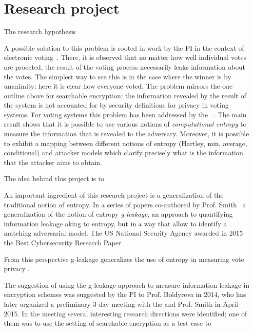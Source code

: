 
\section{Research project}
\label{sec:prop_hyp}

The research hypothesis 


A possible solution to this problem is rooted in work by the PI in the context of electronic voting~\cite{bernhard2012measuring}. 
There, it is observed that no matter how well individual votes are proected, the result of the voting process necessarily leaks information about the votes.
The simplest way to see this is in the case where the winner is by unanimity: here it is clear how everyone voted.  The problem mirrors the one outline above for searchable encryption:  the information revealed by the result of the system is not accounted for by security definitions for privacy in voting systems. 
For voting systems this problem has been addressed by the \PI~\cite{bernhard2012measuring}. 
The main result shows that it is possible to use various notions of \emph{computational entropy} to measure the information that is revealed to the adversary.  
Moreover, it is possible to exhibit a mapping between different notions of entropy (Hartley, min, average, conditional) and attacker models which clarify precisely what is the information that the attacker aims to obtain. 

The idea behind this project is to 


An important ingredient of this research project is a generalization of the traditional notion of entropy. 
In a series of papers co-authored by Prof. Smith~\cite{DBLP:conf/csfw/AlvimCPS12,DBLP:conf/csfw/AlvimCMMPS14,DBLP:conf/csfw/AlvimCMMPS16,DBLP:conf/csfw/SmithS17} a generalization of the notion of entropy \emph{g-leakage}, 
an approach to quantifying information leakage aking to entropy, but in a way that allow to identify a matching adversarial model.  
The US National Security Agency awarded in 2015 the Best Cybersecurity Research Paper 

From this perspective g-leakage generalizes the use of entropy in measuring vote privacy \cite{bernhard2012measuring}. 

The suggestion of using the g-leakage approach to measure information leakage in encryption schemes was suggested by the PI to Prof. Boldyreva in 2014, who has later organized a preliminary 3-day meeting with the \PI and Prof. Smith in April 2015.  
In the meeting several interesting research directions were identified; one of them was to use the setting of searchable encryption as a test case to 


